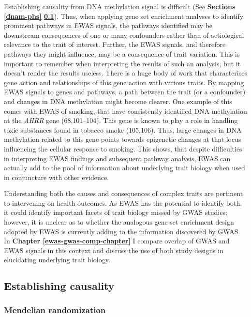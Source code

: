 \documentclass[11pt,oneside]{bristolthesis}
\begin{document}
Establishing causality from DNA methylation signal is difficult (See \textbf{Sections \ref{dnam-phs} \ref{establishing-causality}}). Thus, when applying gene set enrichment analyses to identify prominent pathways in EWAS signals, the pathways identified may be downstream consequences of one or many confounders rather than of aetiological relevance to the trait of interest. Further, the EWAS signals, and therefore pathways they might influence, may be a consequence of trait variation. This is important to remember when interpreting the results of such an analysis, but it doesn't render the results useless. There is a huge body of work that characterises gene action and relationships of this gene action with various traits. By mapping EWAS signals to genes and pathways, a path between the trait (or a confounder) and changes in DNA methylation might become clearer. One example of this comes with EWAS of smoking, that have consistently identified DNA methylation at the \emph{AHRR} gene (68,101--104). This gene is known to play a role in handling toxic substances found in tobacco smoke (105,106). Thus, large changes in DNA methylation related to this gene points towards epigenetic changes at that locus influencing the cellular response to smoking. This shows, that despite difficulties in interpreting EWAS findings and subsequent pathway analysis, EWAS can actually add to the pool of information about underlying trait biology when used in conjuncture with other evidence.

Understanding both the causes and consequences of complex traits are pertinent to intervening on health outcomes. As EWAS has the potential to identify both, it could identify important facets of trait biology missed by GWAS studies; however, it is unclear as to whether the analogous gene set enrichment design adopted by EWAS is currently adding to the information discovered by GWAS. In \textbf{Chapter \ref{ewas-gwas-comp-chapter}} I compare overlap of GWAS and EWAS signals in this context and discuss the use of both study designs in elucidating underlying trait biology.

\hypertarget{establishing-causality}{%
\subsection{Establishing causality}\label{establishing-causality}}

\hypertarget{mr-01}{%
\subsubsection{Mendelian randomization}\label{mr-01}}
\end{document}
